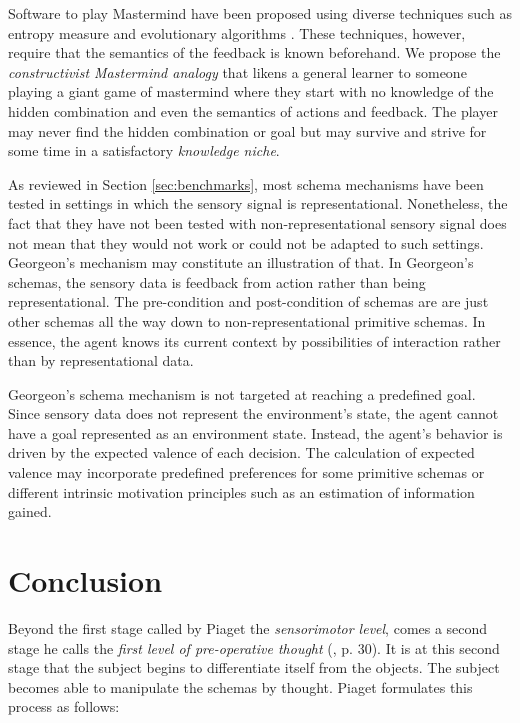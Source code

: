 \documentclass[runningheads]{llncs}
\begin{document}
Software to play Mastermind have been proposed using diverse techniques such as entropy measure and evolutionary algorithms \cite{cotta_entropy-driven_2010}.
These techniques, however, require that the semantics of the feedback is known beforehand. 
We propose the \textit{constructivist Mastermind analogy} that likens a general learner to someone playing a giant game of mastermind where they start with no knowledge of the hidden combination and even the semantics of actions and feedback.
The player may never find the hidden combination or goal but may survive and strive for some time in a satisfactory \textit{knowledge niche}.

As reviewed in Section \ref{sec:benchmarks}, most schema mechanisms have been tested in settings in which the sensory signal is representational.
Nonetheless, the fact that they have not been tested with non-representational sensory signal does not mean that they would not work or could not be adapted to such settings. 
Georgeon's mechanism may constitute an illustration of that.  
In Georgeon's schemas, the sensory data is feedback from action rather than being representational. 
The pre-condition and post-condition of schemas are are just other schemas all the way down to non-representational primitive schemas. 
In essence, the agent knows its current context by possibilities of interaction rather than by representational data. 

Georgeon's schema mechanism is not targeted at reaching a predefined goal. Since sensory data does not represent the environment's state, the agent cannot have a goal represented as an environment state. Instead, the agent's behavior is driven by the expected valence of each decision. 
The calculation of expected valence may incorporate predefined preferences for some primitive schemas or different intrinsic motivation principles such as an estimation of information gained. 

\section{Conclusion}

Beyond the first stage called by Piaget the \textit{sensorimotor level}, comes a second stage he calls the \textit{first level of pre-operative thought} (\cite{piaget_lepistemologie_2011}, p. 30). 
It is at this second stage that the subject begins to differentiate itself from the objects. 
The subject becomes able to manipulate the schemas by thought. 
Piaget formulates this process as follows: 
\\
\end{document}
